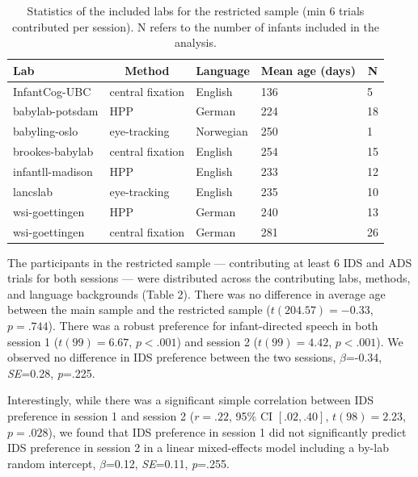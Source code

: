 \documentclass[
  man, donotrepeattitle,floatsintext]{apa6}
\begin{document}
\begin{table}[tbp]

\begin{center}
\begin{threeparttable}

\caption{\label{tab:labs6}Statistics of the included labs for the restricted sample (min 6 trials contributed per session). N refers to the number of infants included in the analysis.}

\begin{tabular}{lllll}
\toprule
Lab & \multicolumn{1}{c}{Method} & \multicolumn{1}{c}{Language} & \multicolumn{1}{c}{Mean age (days)} & \multicolumn{1}{c}{N}\\
\midrule
InfantCog-UBC & central fixation & English & 136 & 5\\
babylab-potsdam & HPP & German & 224 & 18\\
babyling-oslo & eye-tracking & Norwegian & 250 & 1\\
brookes-babylab & central fixation & English & 254 & 15\\
infantll-madison & HPP & English & 233 & 12\\
lancslab & eye-tracking & English & 235 & 10\\
wsi-goettingen & HPP & German & 240 & 13\\
wsi-goettingen & central fixation & German & 281 & 26\\
\bottomrule
\end{tabular}

\end{threeparttable}
\end{center}

\end{table}

The participants in the restricted sample --- contributing at least 6 IDS and ADS trials for both sessions --- were distributed across the contributing labs, methods, and language backgrounds (Table 2). There was no difference in average age between the main sample and the restricted sample (\(t(204.57) = -0.33\), \(p = .744\)). There was a robust preference for infant-directed speech in both session 1 (\(t(99) = 6.67\), \(p < .001\)) and session 2 (\(t(99) = 4.42\), \(p < .001\)). We observed no difference in IDS preference between the two sessions, \(\beta\)=-0.34, \emph{SE}=0.28, \emph{p}=.225.

Interestingly, while there was a significant simple correlation between IDS preference in session 1 and session 2 (\(r = .22\), 95\% CI \([.02, .40]\), \(t(98) = 2.23\), \(p = .028\)), we found that IDS preference in session 1 did not significantly predict IDS preference in session 2 in a linear mixed-effects model including a by-lab random intercept, \(\beta\)=0.12, \emph{SE}=0.11, \emph{p}=.255.
\end{document}
